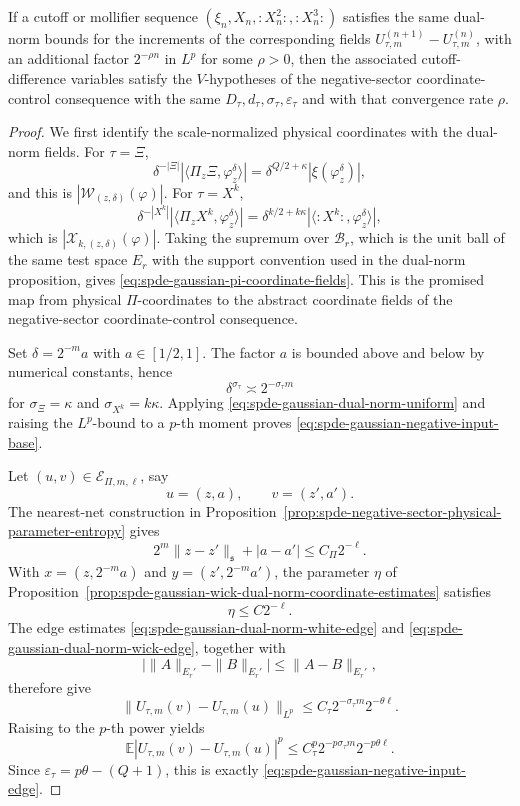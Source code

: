 \begin{proposition}
If a cutoff or mollifier sequence
\((\xi_n,X_n,:X_n^2:,:X_n^3:)\) satisfies the same dual-norm bounds for the
increments of the corresponding fields \(U_{\tau,m}^{(n+1)}-U_{\tau,m}^{(n)}\),
with an additional factor \(2^{-\rho n}\) in \(L^p\) for some \(\rho>0\),
then the associated cutoff-difference variables satisfy the \(V\)-hypotheses
of
the negative-sector coordinate-control consequence with
the same \(D_\tau,d_\tau,\sigma_\tau,\varepsilon_\tau\) and with that
convergence rate \(\rho\).
\end{proposition}

\begin{proof}
We first identify the scale-normalized physical coordinates with the
dual-norm fields.  For \(\tau=\Xi\),
\[
  \delta^{-|\Xi|}
  |\langle\Pi_z\Xi,\varphi_z^\delta\rangle|
  =
  \delta^{Q/2+\kappa}|\xi(\varphi_z^\delta)|,
\]
and this is \(|\mathcal W_{(z,\delta)}(\varphi)|\).  For
\(\tau=X^k\),
\[
  \delta^{-|X^k|}
  |\langle\Pi_z X^k,\varphi_z^\delta\rangle|
  =
  \delta^{k/2+k\kappa}
  |\langle :X^k:,\varphi_z^\delta\rangle|,
\]
which is \(|\mathcal X_{k,(z,\delta)}(\varphi)|\).  Taking the supremum over
\(\mathcal B_r\), which is the unit ball of the same test space \(E_r\) with
the support convention used in the dual-norm proposition, gives
\eqref{eq:spde-gaussian-pi-coordinate-fields}.  This is the promised map from
physical \(\Pi\)-coordinates to the abstract coordinate fields of
the negative-sector coordinate-control consequence.

Set \(\delta=2^{-m}a\) with \(a\in[1/2,1]\).  The factor \(a\) is bounded
above and below by numerical constants, hence
\[
  \delta^{\sigma_\tau}\asymp 2^{-\sigma_\tau m}
\]
for \(\sigma_\Xi=\kappa\) and \(\sigma_{X^k}=k\kappa\).  Applying
\eqref{eq:spde-gaussian-dual-norm-uniform} and raising the \(L^p\)-bound to a
\(p\)-th moment proves
\eqref{eq:spde-gaussian-negative-input-base}.

Let \((u,v)\in\mathcal E_{\Pi,m,\ell}\), say
\[
  u=(z,a),\qquad v=(z',a').
\]
The nearest-net construction in
Proposition~\ref{prop:spde-negative-sector-physical-parameter-entropy} gives
\begin{equation}
  2^m\|z-z'\|_{\mathfrak s}+|a-a'|
  \leq
  C_{\Pi}2^{-\ell}.
  \label{eq:spde-gaussian-negative-input-edge-distance}
\end{equation}
With \(x=(z,2^{-m}a)\) and \(y=(z',2^{-m}a')\), the parameter
\(\eta\) of
Proposition~\ref{prop:spde-gaussian-wick-dual-norm-coordinate-estimates}
satisfies
\[
  \eta\leq C2^{-\ell}.
\]
The edge estimates
\eqref{eq:spde-gaussian-dual-norm-white-edge} and
\eqref{eq:spde-gaussian-dual-norm-wick-edge}, together with
\[
  \bigl|\|A\|_{E_r'}-\|B\|_{E_r'}\bigr|
  \leq
  \|A-B\|_{E_r'},
\]
therefore give
\[
  \|U_{\tau,m}(v)-U_{\tau,m}(u)\|_{L^p}
  \leq
  C_\tau 2^{-\sigma_\tau m}2^{-\theta\ell}.
\]
Raising to the \(p\)-th power yields
\[
  \mathbb E|U_{\tau,m}(v)-U_{\tau,m}(u)|^p
  \leq
  C_\tau^p2^{-p\sigma_\tau m}2^{-p\theta\ell}.
\]
Since \(\varepsilon_\tau=p\theta-(Q+1)\), this is exactly
\eqref{eq:spde-gaussian-negative-input-edge}.


\end{proof}
